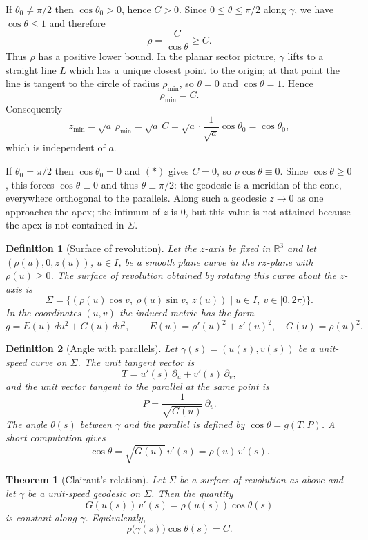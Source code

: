 \documentclass[12pt,a4paper]{article}
\theoremstyle{plain}
\newtheorem{theorem}{Theorem}[section]
\newtheorem{definition}{Definition}
\theoremstyle{definition}      %
\begin{document}
If $\theta_0\neq\pi/2$ then $\cos\theta_0>0$, hence $C>0$. Since
$0\le\theta\le\pi/2$ along $\gamma$, we have $\cos\theta\le1$ and therefore
\[
\rho = \frac{C}{\cos\theta} \ge C.
\]
Thus $\rho$ has a positive lower bound. In the planar sector picture,
$\gamma$ lifts to a straight line $L$ which has a unique closest point to
the origin; at that point the line is tangent to the circle of radius
$\rho_{\min}$, so $\theta=0$ and $\cos\theta=1$. Hence
\[
\rho_{\min} = C.
\]
Consequently
\[
z_{\min} = \sqrt{a}\,\rho_{\min}
= \sqrt{a}\,C
= \sqrt{a}\cdot\frac{1}{\sqrt{a}}\cos\theta_0
= \cos\theta_0,
\]
which is independent of $a$.

If $\theta_0=\pi/2$ then $\cos\theta_0=0$ and $(*)$ gives $C=0$, so
$\rho\cos\theta\equiv0$. Since $\cos\theta\ge0$, this forces
$\cos\theta\equiv0$ and thus $\theta\equiv\pi/2$: the geodesic is a meridian
of the cone, everywhere orthogonal to the parallels. Along such a geodesic
$z\to0$ as one approaches the apex; the infimum of $z$ is $0$, but this
value is not attained because the apex is not contained in $\Sigma$.
	
	
	
\begin{definition}[Surface of revolution]
	Let the $z$-axis be fixed in $\mathbb R^3$ and let
	$(\rho(u),0,z(u))$, $u\in I$, be a smooth plane curve in the $rz$-plane
	with $\rho(u)\ge 0$. The \emph{surface of revolution} obtained by rotating
	this curve about the $z$-axis is
	\[
	\Sigma = \{(\rho(u)\cos v,\ \rho(u)\sin v,\ z(u)) \mid u\in I,\ v\in[0,2\pi)\}.
	\]
	In the coordinates $(u,v)$ the induced metric has the form
	\[
	g = E(u)\,du^2 + G(u)\,dv^2,\qquad
	E(u)=\rho'(u)^2+z'(u)^2,\quad G(u)=\rho(u)^2.
	\]
\end{definition}

\begin{definition}[Angle with parallels]
	Let $\gamma(s)=(u(s),v(s))$ be a unit-speed curve on $\Sigma$.
	The unit tangent vector is
	\[
	T = u'(s)\,\partial_u + v'(s)\,\partial_v,
	\]
	and the unit vector tangent to the parallel at the same point is
	\[
	P = \frac{1}{\sqrt{G(u)}}\,\partial_v.
	\]
	The angle $\theta(s)$ between $\gamma$ and the parallel is defined by
	$\cos\theta = g(T,P)$. A short computation gives
	\[
	\cos\theta = \sqrt{G(u)}\,v'(s) = \rho(u)\,v'(s).
	\]
\end{definition}

\begin{theorem}[Clairaut's relation]
	Let $\Sigma$ be a surface of revolution as above and let
	$\gamma$ be a unit-speed geodesic on $\Sigma$.
	Then the quantity
	\[
	G(u(s))\,v'(s)=\rho(u(s))\cos\theta(s)
	\]
	is constant along $\gamma$. Equivalently,
	\[
	\boxed{\rho\bigl(\gamma(s)\bigr)\cos\theta(s)=C.}
	\]
\end{theorem}
\end{document}
